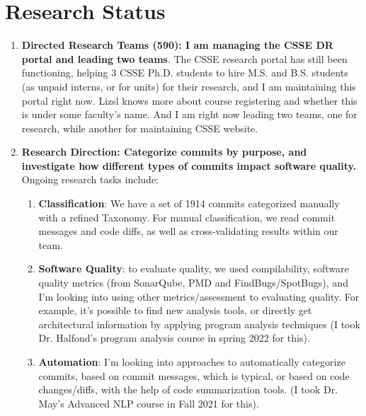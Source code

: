 \documentclass{article}
\begin{document}
\section*{Research Status}
\begin{enumerate}
\item \textbf{Directed Research Teams (590): I am managing the CSSE DR portal and leading two teams}. The CSSE research portal has still been functioning, helping 3 CSSE Ph.D. students to hire M.S. and B.S. students (as unpaid interns, or for units) for their research, and I am maintaining this portal right now. Lizsl knows more about course registering and whether this is under some faculty’s name. And I am right now leading two teams, one for research, while another for maintaining CSSE website.


\item \textbf{Research Direction: Categorize commits by purpose, and investigate how different types of commits impact software quality.} Ongoing research tasks include: 

\begin{enumerate}
\item \textbf{Classification}: We have a set of 1914 commits categorized manually with a refined Taxonomy. For manual classification, we read commit messages and code diffs, as well as cross-validating results within our team.
\item \textbf{Software Quality}: to evaluate quality, we used compilability, software quality metrics (from SonarQube, PMD and FindBugs/SpotBugs), and I’m looking into using other metrics/assessment to evaluating quality. For example, it’s possible to find new analysis tools, or directly get architectural information by applying program analysis techniques (I took Dr. Halfond’s program analysis course in spring 2022 for this).
\item \textbf{Automation}: I’m looking into approaches to automatically categorize commits, based on commit messages, which is typical, or based on code changes/diffs, with the help of code summarization tools. (I took Dr. May’s Advanced NLP course in Fall 2021 for this).
\end{enumerate}

\end{enumerate}
\end{document}
